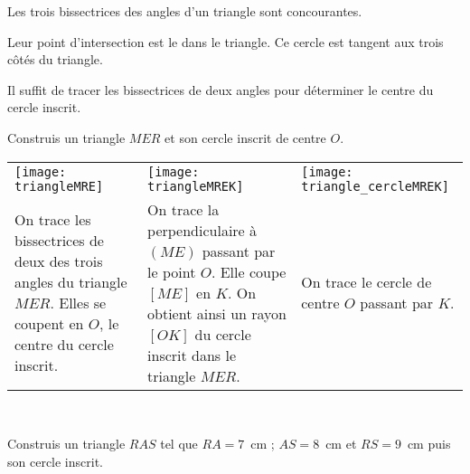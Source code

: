  \begin{methode*1}
 
\begin{aconnaitre}
Les trois bissectrices des angles d'un triangle sont concourantes. 

Leur point d'intersection est le  dans le triangle. Ce cercle est tangent aux trois côtés du triangle.
 \end{aconnaitre}
 
 \begin{remarque}
Il suffit de tracer les bissectrices de deux angles pour déterminer le centre du cercle inscrit.
 \end{remarque}
 
 \begin{exemple*1}
 Construis un triangle $MER$ et son cercle inscrit de centre $O$. 
 \begin{tabularx}{\textwidth}{X|X|X}
 \texttt{[image: triangleMRE]} &  \texttt{[image: triangleMREK]} & \texttt{[image: triangle\_cercleMREK]} \\ 
 On trace les bissectrices de deux des trois angles du triangle $MER$. Elles se coupent en $O$, le centre du cercle inscrit. & On trace la perpendiculaire à $(ME)$ passant par le point $O$. Elle coupe $[ME]$ en $K$. On obtient ainsi un rayon $[OK]$ du cercle inscrit dans le triangle $MER$. & On trace le cercle de centre $O$ passant par $K$. \\
 \end{tabularx} \\

\end{exemple*1}
 
 \exercice
Construis un triangle $RAS$ tel que $RA = 7$ cm ; $AS = 8$ cm et $RS = 9$ cm puis son cercle inscrit.
 
 \end{methode*1}

